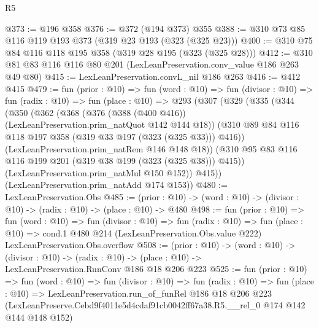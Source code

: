 \begin{lexlean}{R5}
\begin{coremodule}
@373 := @196 @358
@376 := @372 (@194 @373) @355
@388 := @310 @73 @85 @116 @119 @193 @373 (@319 @23 @193 (@323 (@325 @23)))
@400 := @310 @75 @84 @116 @118 @195 @358 (@319 @28 @195 (@323 (@325 @28)))
@412 := @310 @81 @83 @116 @116 @80 @201 (LexLeanPreservation.conv_value @186 @263 @49 @80)
@415 := LexLeanPreservation.convL_nil @186 @263
@416 := @412 @415
@479 := fun (prior : @10) =>
  fun (word : @10) =>
  fun (divisor : @10) =>
  fun (radix : @10) =>
  fun (place : @10) =>
  @293
    (@307
      (@329
        (@335
          (@344
            (@350
              (@362
                (@368
                  (@376 (@388 (@400 @416)) (LexLeanPreservation.prim_natQuot @142 @144 @18))
                  (@310 @89 @84 @116 @118 @197 @358 (@319 @33 @197 (@323 (@325 @33))) @416))
                (LexLeanPreservation.prim_natRem @146 @148 @18))
              (@310 @95 @83 @116 @116 @199 @201 (@319 @38 @199 (@323 (@325 @38))) @415))
            (LexLeanPreservation.prim_natMul @150 @152))
          @415))
      (LexLeanPreservation.prim_natAdd @174 @153))
@480 := LexLeanPreservation.Obs
@485 := (prior : @10) -> (word : @10) -> (divisor : @10) -> (radix : @10) -> (place : @10) -> @480
@498 := fun (prior : @10) =>
  fun (word : @10) =>
  fun (divisor : @10) =>
  fun (radix : @10) =>
  fun (place : @10) =>
  cond.{1} @480 @214 (LexLeanPreservation.Obs.value @222) LexLeanPreservation.Obs.overflow
@508 := (prior : @10) ->
  (word : @10) ->
  (divisor : @10) ->
  (radix : @10) -> (place : @10) -> LexLeanPreservation.RunConv @186 @18 @206 @223
@525 := fun (prior : @10) =>
  fun (word : @10) =>
  fun (divisor : @10) =>
  fun (radix : @10) =>
  fun (place : @10) =>
  LexLeanPreservation.run_of_funRel
    @186
    @18
    @206
    @223
    (LexLeanPreserve.Cebd9f4011e5d4cdaf91cb0042ff67a38.R5.__rel_0 @174 @142 @144 @148 @152)
\end{coremodule}
\end{lexlean}
